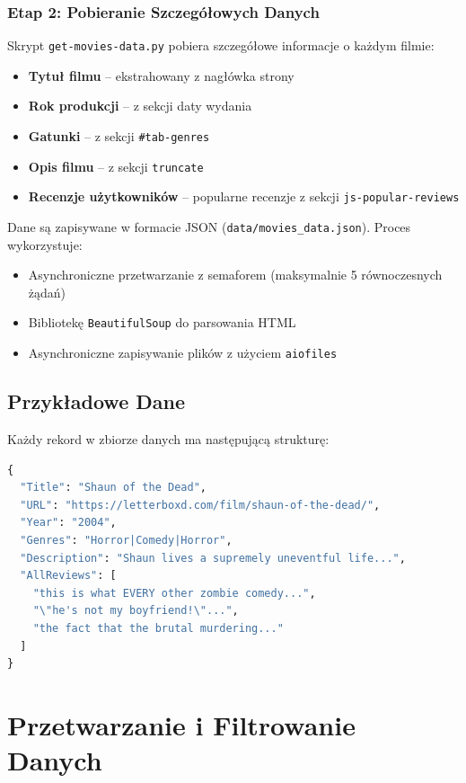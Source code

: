 \documentclass[12pt,a4paper]{article}
\begin{document}
\subsubsection{Etap 2: Pobieranie Szczegółowych Danych}

Skrypt \texttt{get-movies-data.py} pobiera szczegółowe informacje o każdym filmie:

\begin{itemize}
    \item \textbf{Tytuł filmu} -- ekstrahowany z nagłówka strony
    \item \textbf{Rok produkcji} -- z sekcji daty wydania
    \item \textbf{Gatunki} -- z sekcji \texttt{\#tab-genres}
    \item \textbf{Opis filmu} -- z sekcji \texttt{truncate}
    \item \textbf{Recenzje użytkowników} -- popularne recenzje z sekcji \texttt{js-popular-reviews}
\end{itemize}

Dane są zapisywane w formacie JSON (\texttt{data/movies_data.json}). Proces wykorzystuje:
\begin{itemize}
    \item Asynchroniczne przetwarzanie z semaforem (maksymalnie 5 równoczesnych żądań)
    \item Bibliotekę \texttt{BeautifulSoup} do parsowania HTML
    \item Asynchroniczne zapisywanie plików z użyciem \texttt{aiofiles}
\end{itemize}

\subsection{Przykładowe Dane}

Każdy rekord w zbiorze danych ma następującą strukturę:

\begin{lstlisting}[language=Python, basicstyle=\small]
{
  "Title": "Shaun of the Dead",
  "URL": "https://letterboxd.com/film/shaun-of-the-dead/",
  "Year": "2004",
  "Genres": "Horror|Comedy|Horror",
  "Description": "Shaun lives a supremely uneventful life...",
  "AllReviews": [
    "this is what EVERY other zombie comedy...",
    "\"he's not my boyfriend!\"...",
    "the fact that the brutal murdering..."
  ]
}
\end{lstlisting}

\section{Przetwarzanie i Filtrowanie Danych}
\end{document}
